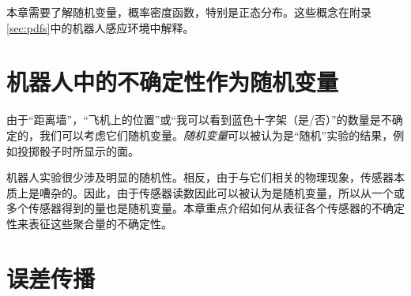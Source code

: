 
本章需要了解随机变量，概率密度函数，特别是正态分布。这些概念在附录\ref{sec:pdfs}中的机器人感应环境中解释。



\section{机器人中的不确定性作为随机变量}
由于“距离墙”，“飞机上的位置”或“我可以看到蓝色十字架（是/否）”的数量是不确定的，我们可以考虑它们随机变量。\emph{随机变量}可以被认为是“随机”实验的结果，例如投掷骰子时所显示的面。

机器人实验很少涉及明显的随机性。相反，由于与它们相关的物理现象，传感器本质上是嘈杂的。因此，由于传感器读数因此可以被认为是随机变量，所以从一个或多个传感器得到的量也是随机变量。本章重点介绍如何从表征各个传感器的不确定性来表征这些聚合量的不确定性。

\section{误差传播}
\label{sec:errorprop}

